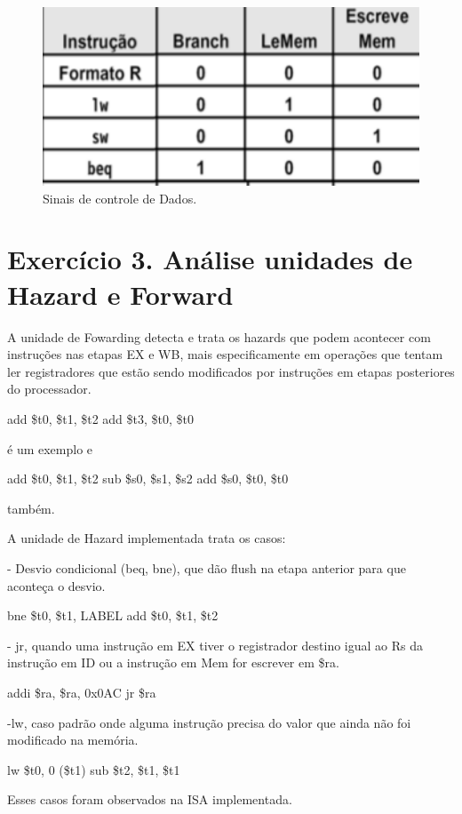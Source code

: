 \documentclass[12pt]{article}
\begin{document}
\begin{figure}[H]
	\flushleft
	\includegraphics[width=1\textwidth]{mem.png}
	\caption{Sinais de controle de Dados.}
	\label{fig:mem}
\end{figure}

\section{Exercício 3. Análise unidades de Hazard e Forward}
\label{sec:hazardforward}

A unidade de Fowarding detecta e trata os hazards que podem acontecer com instruções nas etapas EX e WB, mais especificamente em operações que tentam ler registradores que estão sendo modificados por instruções em etapas posteriores do processador.

 add \$t0, \$t1, \$t2 
 add \$t3, \$t0, \$t0 

é um exemplo e

 add \$t0, \$t1, \$t2 
 sub \$s0, \$s1, \$s2 
 add \$s0, \$t0, \$t0 

também.

A unidade de Hazard implementada trata os casos:

-  Desvio condicional (beq, bne), que dão flush na etapa anterior para que aconteça o desvio.

 bne \$t0, \$t1, LABEL
 add \$t0, \$t1, \$t2

- jr, quando uma instrução em EX tiver o registrador destino igual ao Rs da instrução em ID ou a instrução em Mem for escrever em \$ra.

 addi \$ra, \$ra, 0x0AC 
 jr \$ra 

-lw, caso padrão onde alguma instrução precisa do valor que ainda não foi modificado na memória.

lw \$t0, 0 (\$t1)
sub \$t2, \$t1, \$t1


Esses casos foram observados na ISA implementada.
\end{document}

